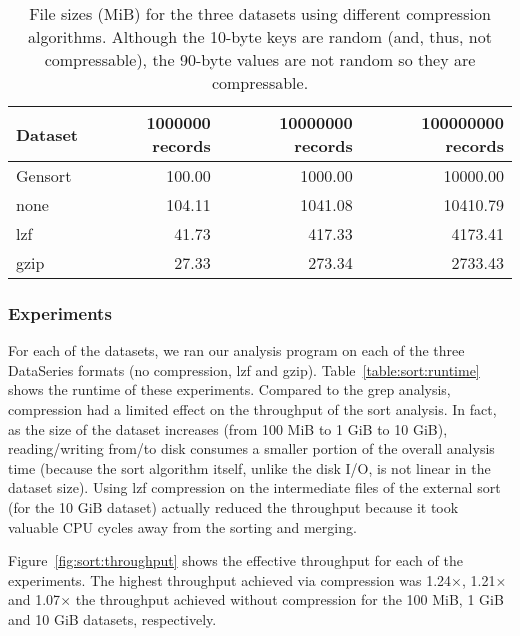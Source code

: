 \begin{table*}
\centering
\begin{tabular}{|l|r|r|r|}\hline

Dataset    & 1000000 records & 10000000 records  & 100000000 records \\
\hline
Gensort             & 100.00 & 1000.00 & 10000.00 \\
none                & 104.11 & 1041.08 & 10410.79 \\
lzf                 & 41.73  & 417.33  & 4173.41  \\
gzip                & 27.33  & 273.34  & 2733.43  \\
\hline
\end{tabular}


\caption{File sizes (MiB) for the three datasets using different compression algorithms. Although the 10-byte keys are random (and, thus, not compressable), the 90-byte values are not random so they are compressable.}

\label{table:sort:compression}
\end{table*}

\subsubsection{Experiments}

For each of the datasets, we ran our analysis program on each of the three DataSeries formats (no compression, lzf and gzip). Table~\ref{table:sort:runtime} shows the runtime of these experiments. 
Compared to the grep analysis, compression had a limited effect on the throughput of the sort analysis. In fact, as the size of the dataset increases (from 100 MiB to 1 GiB to 10 GiB), reading/writing from/to disk consumes a smaller portion of the overall analysis time (because the sort algorithm itself, unlike the disk I/O, is not linear in the dataset size). Using lzf compression on the intermediate files of the external sort (for the 10 GiB dataset) actually reduced the throughput because it took valuable CPU cycles away from the sorting and merging.

Figure~\ref{fig:sort:throughput} shows the effective throughput for each of the experiments. The highest throughput achieved via compression was 1.24$\times$, 1.21$\times$ and 1.07$\times$ the throughput achieved without compression for the 100 MiB, 1 GiB and 10 GiB datasets, respectively.

